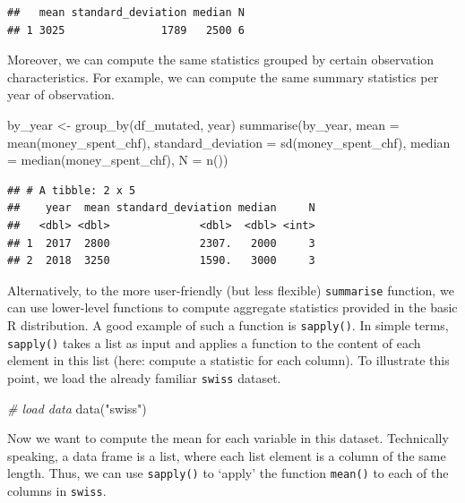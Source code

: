 \documentclass[
  12pt,
]{style/krantz}
\newenvironment{Shaded}{\begin{snugshade}}{\end{snugshade}}
\newcommand{\AttributeTok}[1]{\textcolor[rgb]{0.77,0.63,0.00}{#1}}
\newcommand{\CommentTok}[1]{\textcolor[rgb]{0.56,0.35,0.01}{\textit{#1}}}
\newcommand{\FunctionTok}[1]{\textcolor[rgb]{0.00,0.00,0.00}{#1}}
\newcommand{\NormalTok}[1]{#1}
\newcommand{\OtherTok}[1]{\textcolor[rgb]{0.56,0.35,0.01}{#1}}
\newcommand{\StringTok}[1]{\textcolor[rgb]{0.31,0.60,0.02}{#1}}
\begin{document}
\begin{verbatim}
##   mean standard_deviation median N
## 1 3025               1789   2500 6
\end{verbatim}

Moreover, we can compute the same statistics grouped by certain observation characteristics. For example, we can compute the same summary statistics per year of observation.

\begin{Shaded}
\begin{Highlighting}[]
\NormalTok{by\_year }\OtherTok{\textless{}{-}} \FunctionTok{group\_by}\NormalTok{(df\_mutated, year)}
\FunctionTok{summarise}\NormalTok{(by\_year,}
          \AttributeTok{mean =} \FunctionTok{mean}\NormalTok{(money\_spent\_chf),}
          \AttributeTok{standard\_deviation =} \FunctionTok{sd}\NormalTok{(money\_spent\_chf),}
          \AttributeTok{median =} \FunctionTok{median}\NormalTok{(money\_spent\_chf),}
          \AttributeTok{N =} \FunctionTok{n}\NormalTok{())}
\end{Highlighting}
\end{Shaded}

\begin{verbatim}
## # A tibble: 2 x 5
##    year  mean standard_deviation median     N
##   <dbl> <dbl>              <dbl>  <dbl> <int>
## 1  2017  2800              2307.   2000     3
## 2  2018  3250              1590.   3000     3
\end{verbatim}

Alternatively, to the more user-friendly (but less flexible) \texttt{summarise} function, we can use lower-level functions to compute aggregate statistics provided in the basic R distribution. A good example of such a function is \texttt{sapply()}. In simple terms, \texttt{sapply()} takes a list as input and applies a function to the content of each element in this list (here: compute a statistic for each column). To illustrate this point, we load the already familiar \texttt{swiss} dataset.

\begin{Shaded}
\begin{Highlighting}[]
\CommentTok{\# load data}
\FunctionTok{data}\NormalTok{(}\StringTok{"swiss"}\NormalTok{)}
\end{Highlighting}
\end{Shaded}

Now we want to compute the mean for each variable in this dataset. Technically speaking, a data frame is a list, where each list element is a column of the same length. Thus, we can use \texttt{sapply()} to `apply' the function \texttt{mean()} to each of the columns in \texttt{swiss}.
\end{document}
